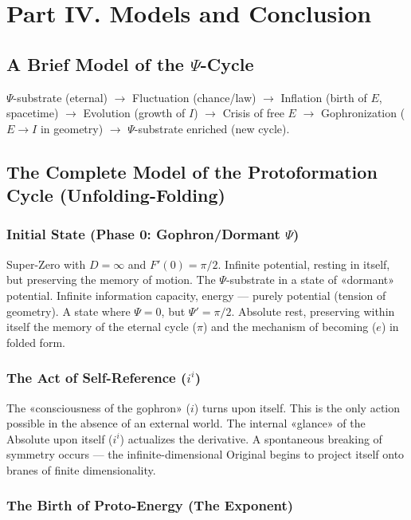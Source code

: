 \documentclass[a4paper,12pt]{article}
\begin{document}
	\newpage
	\section{Part IV. Models and Conclusion}
	
	\subsection{A Brief Model of the $\Psi$-Cycle}
	
	$\Psi$-substrate (eternal) $\to$ Fluctuation (chance/law) $\to$ Inflation (birth of $E$, spacetime) $\to$ Evolution (growth of $I$) $\to$ Crisis of free $E$ $\to$ Gophronization ($E \to I$ in geometry) $\to$ $\Psi$-substrate enriched (new cycle).
	
	\subsection{The Complete Model of the Protoformation Cycle (Unfolding-Folding)}
	
	\subsubsection{Initial State (Phase 0: Gophron/Dormant $\Psi$)}
	
	Super-Zero with $D = \infty$ and $F'(0) = \pi/2$. Infinite potential, resting in itself, but preserving the memory of motion. The $\Psi$-substrate in a state of «dormant» potential. Infinite information capacity, energy — purely potential (tension of geometry). A state where $\Psi = 0$, but $\Psi' = \pi/2$. Absolute rest, preserving within itself the memory of the eternal cycle ($\pi$) and the mechanism of becoming ($e$) in folded form.
	
	\subsubsection{The Act of Self-Reference ($i^i$)}
	
	The «consciousness of the gophron» ($i$) turns upon itself. This is the only action possible in the absence of an external world. The internal «glance» of the Absolute upon itself ($i^i$) actualizes the derivative. A spontaneous breaking of symmetry occurs — the infinite-dimensional Original begins to project itself onto branes of finite dimensionality.
	
	\subsubsection{The Birth of Proto-Energy (The Exponent)}
	
\end{document}
